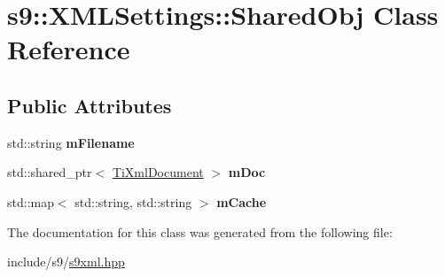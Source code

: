 \hypertarget{classs9_1_1XMLSettings_1_1SharedObj}{\section{s9\-:\-:\-X\-M\-L\-Settings\-:\-:\-Shared\-Obj \-Class \-Reference}
\label{classs9_1_1XMLSettings_1_1SharedObj}
}
\subsection*{\-Public \-Attributes}
\begin{DoxyCompactItemize}
\item 
\hypertarget{classs9_1_1XMLSettings_1_1SharedObj_a4538f061d6c2df6b363d5f67d055235d}{std\-::string {\bfseries m\-Filename}}\label{classs9_1_1XMLSettings_1_1SharedObj_a4538f061d6c2df6b363d5f67d055235d}

\item 
\hypertarget{classs9_1_1XMLSettings_1_1SharedObj_a7bbd8ebe1ba95eeaeff3678f4fdb6798}{std\-::shared\-\_\-ptr$<$ \hyperlink{classTiXmlDocument}{\-Ti\-Xml\-Document} $>$ {\bfseries m\-Doc}}\label{classs9_1_1XMLSettings_1_1SharedObj_a7bbd8ebe1ba95eeaeff3678f4fdb6798}

\item 
\hypertarget{classs9_1_1XMLSettings_1_1SharedObj_a57a7a739f31c72de40a6e0981874e792}{std\-::map$<$ std\-::string, \*
std\-::string $>$ {\bfseries m\-Cache}}\label{classs9_1_1XMLSettings_1_1SharedObj_a57a7a739f31c72de40a6e0981874e792}

\end{DoxyCompactItemize}


\-The documentation for this class was generated from the following file\-:\begin{DoxyCompactItemize}
\item 
include/s9/\hyperlink{s9xml_8hpp}{s9xml.\-hpp}\end{DoxyCompactItemize}
